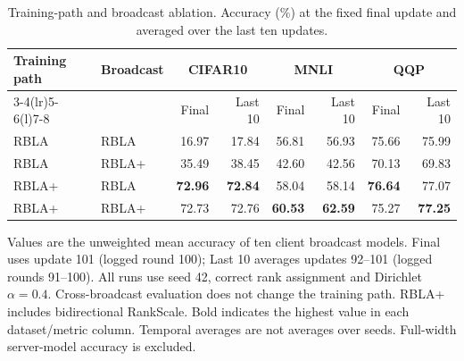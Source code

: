 \begin{table}[t]
  \centering
  \caption{Training-path and broadcast ablation. Accuracy (\%) at the fixed final update and averaged over the last ten updates.}
  \label{tab:ablation-accuracy}
  \small
  \setlength{\tabcolsep}{6pt}
  \begin{tabular}{@{}llrrrrrr@{}}
    \toprule
    Training path & Broadcast & \multicolumn{2}{c}{CIFAR10} & \multicolumn{2}{c}{MNLI} & \multicolumn{2}{c}{QQP} \\
    \cmidrule(lr){3-4}\cmidrule(lr){5-6}\cmidrule(l){7-8}
     & & Final & Last 10 & Final & Last 10 & Final & Last 10 \\
    \midrule
    RBLA & RBLA & 16.97 & 17.84 & 56.81 & 56.93 & 75.66 & 75.99 \\
    RBLA & RBLA+ & 35.49 & 38.45 & 42.60 & 42.56 & 70.13 & 69.83 \\
    RBLA+ & RBLA & \textbf{72.96} & \textbf{72.84} & 58.04 & 58.14 & \textbf{76.64} & 77.07 \\
    RBLA+ & RBLA+ & 72.73 & 72.76 & \textbf{60.53} & \textbf{62.59} & 75.27 & \textbf{77.25} \\
    \bottomrule
  \end{tabular}
  \par\smallskip
  \parbox{\textwidth}{\footnotesize
  Values are the unweighted mean accuracy of ten client broadcast models. Final uses update 101 (logged round 100); Last 10 averages updates 92--101 (logged rounds 91--100). All runs use seed 42, correct rank assignment and Dirichlet $\alpha=0.4$. Cross-broadcast evaluation does not change the training path. RBLA+ includes bidirectional RankScale. Bold indicates the highest value in each dataset/metric column. Temporal averages are not averages over seeds. Full-width server-model accuracy is excluded.}
\end{table}
